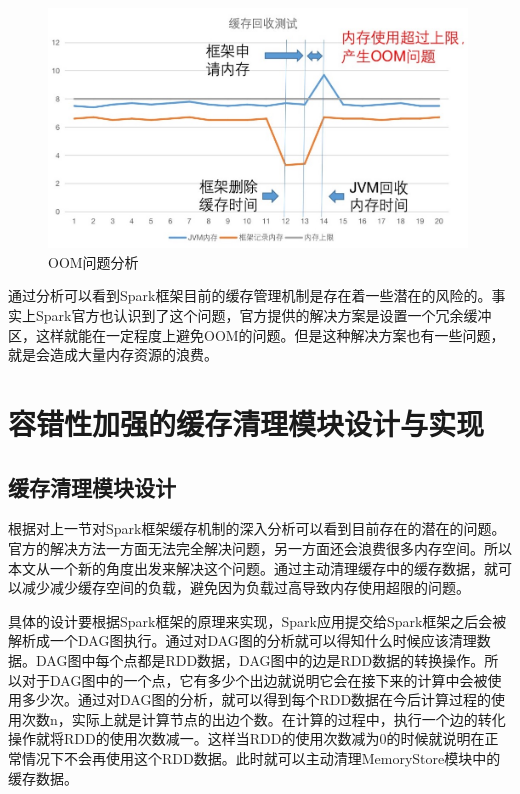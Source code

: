 \begin{figure}[htbp]
    \centering
    \includegraphics[width=0.99\textwidth]{Img/OOM解释.jpg}
    \caption{OOM问题分析}
    \label{fig:oom}
\end{figure}


通过分析可以看到Spark框架目前的缓存管理机制是存在着一些潜在的风险的。事实上Spark官方也认识到了这个问题，官方提供的解决方案是设置一个冗余缓冲区，这样就能在一定程度上避免OOM的问题。但是这种解决方案也有一些问题，就是会造成大量内存资源的浪费。

\section{容错性加强的缓存清理模块设计与实现}

\subsection{缓存清理模块设计}

根据对上一节对Spark框架缓存机制的深入分析可以看到目前存在的潜在的问题。官方的解决方法一方面无法完全解决问题，另一方面还会浪费很多内存空间。所以本文从一个新的角度出发来解决这个问题。通过主动清理缓存中的缓存数据，就可以减少减少缓存空间的负载，避免因为负载过高导致内存使用超限的问题。

具体的设计要根据Spark框架的原理来实现，Spark应用提交给Spark框架之后会被解析成一个DAG图执行。通过对DAG图的分析就可以得知什么时候应该清理数据。DAG图中每个点都是RDD数据，DAG图中的边是RDD数据的转换操作。所以对于DAG图中的一个点，它有多少个出边就说明它会在接下来的计算中会被使用多少次。通过对DAG图的分析，就可以得到每个RDD数据在今后计算过程的使用次数n，实际上就是计算节点的出边个数。在计算的过程中，执行一个边的转化操作就将RDD的使用次数减一。这样当RDD的使用次数减为0的时候就说明在正常情况下不会再使用这个RDD数据。此时就可以主动清理MemoryStore模块中的缓存数据。

